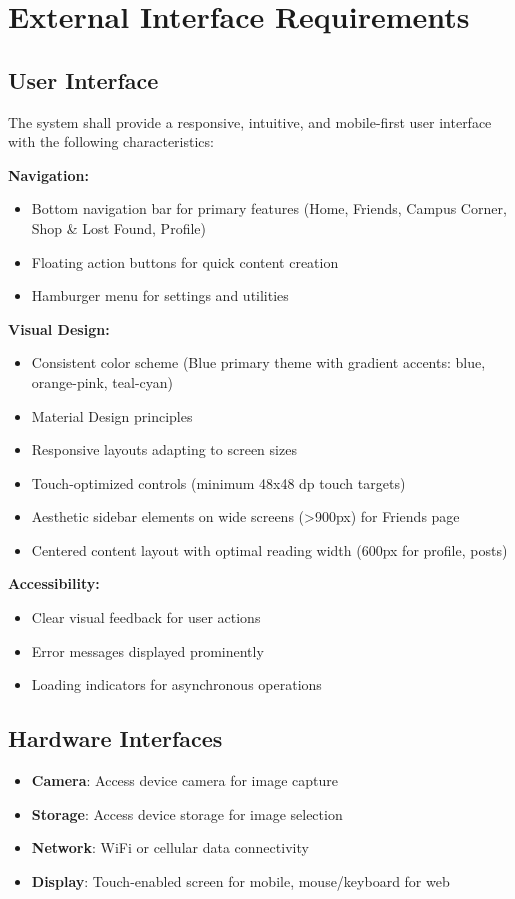 \documentclass[12pt,a4paper]{article}
\begin{document}
\section{External Interface Requirements}

\subsection{User Interface}
The system shall provide a responsive, intuitive, and mobile-first user interface with the following characteristics:

\textbf{Navigation:}
\begin{itemize}
    \item Bottom navigation bar for primary features (Home, Friends, Campus Corner, Shop \& Lost Found, Profile)
    \item Floating action buttons for quick content creation
    \item Hamburger menu for settings and utilities
\end{itemize}

\textbf{Visual Design:}
\begin{itemize}
    \item Consistent color scheme (Blue primary theme with gradient accents: blue, orange-pink, teal-cyan)
    \item Material Design principles
    \item Responsive layouts adapting to screen sizes
    \item Touch-optimized controls (minimum 48x48 dp touch targets)
    \item Aesthetic sidebar elements on wide screens (>900px) for Friends page
    \item Centered content layout with optimal reading width (600px for profile, posts)
\end{itemize}

\textbf{Accessibility:}
\begin{itemize}
    \item Clear visual feedback for user actions
    \item Error messages displayed prominently
    \item Loading indicators for asynchronous operations
\end{itemize}

\subsection{Hardware Interfaces}
\begin{itemize}
    \item \textbf{Camera}: Access device camera for image capture
    \item \textbf{Storage}: Access device storage for image selection
    \item \textbf{Network}: WiFi or cellular data connectivity
    \item \textbf{Display}: Touch-enabled screen for mobile, mouse/keyboard for web
\end{itemize}
\end{document}
